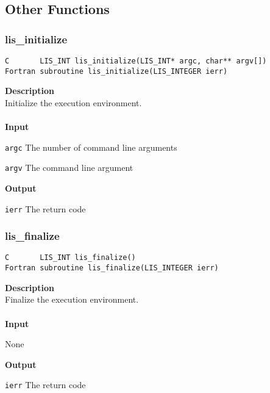 \documentclass[a4paper]{article}
\newcommand{\namelistlabel}[1]{\mbox{#1}\hfill}
\newenvironment{namelist}[1]{%
\begin{list}{}
  {\let\makelabel\namelistlabel
  \settowidth{\labelwidth}{#1}
  \setlength{\leftmargin}{1.1\labelwidth}}
  }{%
\end{list}}
\begin{document}
\newpage
\subsection{Other Functions}
\subsubsection{lis\_initialize}
\begin{screen}
\verb|C       LIS_INT lis_initialize(LIS_INT* argc, char** argv[])|\\
\verb|Fortran subroutine lis_initialize(LIS_INTEGER ierr)|
\end{screen}
{\bf Description}\\
\indent
Initialize the execution environment.
\\ \\
\noindent
{\bf Input}
\begin{namelist}{XXXXXXXXXXXXXXXXXXXX}
\item[\tt argc] The number of command line arguments
\item[\tt argv] The command line argument
\end{namelist}
{\bf Output}
\begin{namelist}{XXXXXXXXXXXXXXXXXXXX}
\item[\tt ierr] The return code
\end{namelist}

\subsubsection{lis\_finalize}
\begin{screen}
\verb|C       LIS_INT lis_finalize()|\\
\verb|Fortran subroutine lis_finalize(LIS_INTEGER ierr)|
\end{screen}
{\bf Description}\\
\indent
Finalize the execution environment.
\\ \\
\noindent
{\bf Input}
\begin{namelist}{XXXXXXXXXXXXXXXXXXXX}
\item[None] 
\end{namelist}
{\bf Output}
\begin{namelist}{XXXXXXXXXXXXXXXXXXXX}
\item[\tt ierr] The return code
\end{namelist}

\newpage
\end{document}
